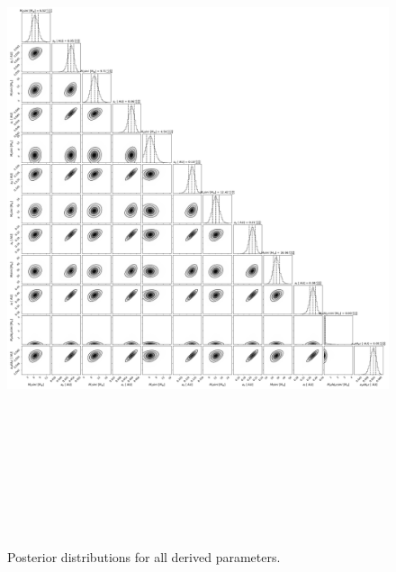 \documentclass{emulateapj}
\begin{document}
\begin{figure}[!h]
\centering

\includegraphics[height=8.0in,width=6.0in,keepaspectratio]{TOI-1246_add_bc_corner_derived_pars.pdf}
\caption{Posterior distributions for all derived parameters.}
\end{figure} 

\end{document}
